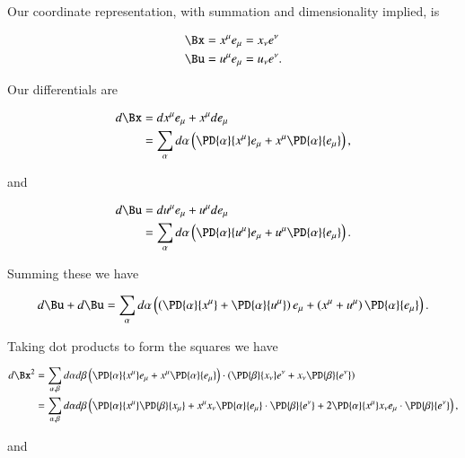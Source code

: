 Our coordinate representation, with summation and dimensionality implied, is

\begin{align}\label{eqn:continuumL2:530}
\Bx &= x^\mu e_\mu = x_\nu e^\nu \\
\Bu &= u^\mu e_\mu = u_\nu e^\nu.
\end{align}

Our differentials are

\begin{equation}\label{eqn:continuumL2:550}
\begin{aligned}
d\Bx 
&= dx^\mu e_\mu + x^\mu d e_\mu \\
&= \sum_\alpha d\alpha \left( 
\PD{\alpha}{x^\mu} e_\mu
+
x^\mu
\PD{\alpha}{e_\mu} 
\right),
\end{aligned}
\end{equation}

and

\begin{equation}\label{eqn:continuumL2:570}
\begin{aligned}
d\Bu 
&= du^\mu e_\mu + u^\mu d e_\mu \\
&= 
\sum_\alpha
d\alpha \left( 
\PD{\alpha}{u^\mu} e_\mu
+
u^\mu
\PD{\alpha}{e_\mu} 
\right).
\end{aligned}
\end{equation}

Summing these we have

\begin{equation}\label{eqn:continuumL2:590}
d\Bu + d\Bu 
= 
\sum_\alpha
d\alpha \left( 
\left(
\PD{\alpha}{x^\mu} 
+
\PD{\alpha}{u^\mu} 
\right)
e_\mu
+
\left(
x^\mu
+
u^\mu
\right)
\PD{\alpha}{e_\mu} 
\right).
\end{equation}

Taking dot products to form the squares we have

\begin{align*}
d\Bx^2 
&= 
\sum_{\alpha, \beta} 
d\alpha 
d\beta 
\left( 
\PD{\alpha}{x^\mu} e_\mu
+
x^\mu
\PD{\alpha}{e_\mu} 
\right)
\cdot
\left( 
\PD{\beta}{x_\nu} e^\nu
+
x_\nu
\PD{\beta}{e^\nu} 
\right) 
\\
&=
\sum_{\alpha, \beta} 
d\alpha 
d\beta 
\left( 
\PD{\alpha}{x^\mu} \PD{\beta}{x_\mu} 
+
x^\mu x_\nu
\PD{\alpha}{e_\mu} 
\cdot
\PD{\beta}{e^\nu} 
+ 
2 \PD{\alpha}{x^\mu} 
x_\nu
e_\mu \cdot
\PD{\beta}{e^\nu} 
\right),
\end{align*}

and

